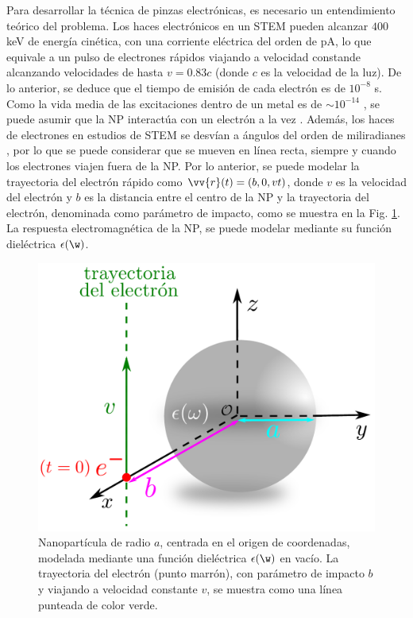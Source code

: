 Para desarrollar la técnica de pinzas electrónicas, es necesario un entendimiento teórico del problema. Los haces electrónicos en un STEM pueden alcanzar $400$ keV de energía cinética, con una corriente eléctrica del orden de pA, lo que equivale a un pulso de electrones rápidos viajando a velocidad constande alcanzando velocidades de hasta $v=0.83 c$ (donde $c$ es la velocidad de la luz). De lo anterior, se deduce que el tiempo de emisión de cada electrón es de $10^{-8}$ s. Como la vida media de las excitaciones dentro de un metal es de $\sim 10^{-14}$ \cite{quijada2010lifetime}, se puede asumir que la NP interactúa con un electrón a la vez \cite{de1999relativistic, GarciadeAbajo-1, deabajo2021optical}. Además,  los haces de electrones en estudios de STEM se desvían a ángulos del orden de miliradianes \cite{deabajo2021optical, Rivacoba1, krehl2018spectral}, por lo que se puede considerar que se mueven en línea recta, siempre y cuando los electrones viajen fuera de la NP. Por lo anterior, se puede modelar la trayectoria del electrón rápido como $\vv{r}(t)=(b, 0, vt)$, donde $v$ es la velocidad del electrón y $b$ es la distancia entre el centro de la NP y la trayectoria del electrón, denominada como parámetro de impacto, como se muestra en la Fig. \ref{fig: system mine}. La respuesta electromagnética de la NP, se puede modelar mediante su función dieléctrica $\epsilon(\w)$.

\begin{figure}[ht!]
\centering
\includegraphics[width=0.5\linewidth]{17-imagenes/1-Intro/system_NP.pdf} 
\caption{Nanopartícula de radio $a$, centrada en el origen de coordenadas, modelada mediante una función dieléctrica $\epsilon(\w)$ en vacío. La trayectoria del electrón (punto marrón), con parámetro de impacto $b$ y viajando a velocidad constante $v$, se muestra como una línea punteada de color verde. \label{fig: system mine}}
\end{figure}

